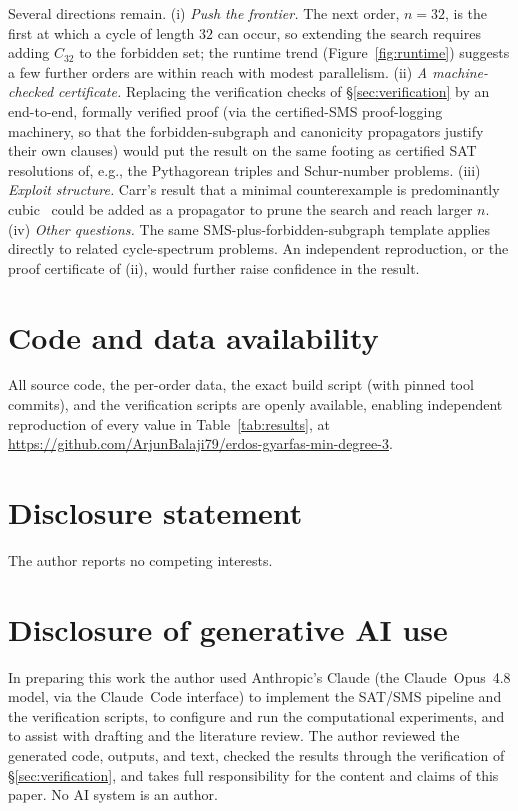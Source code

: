 \documentclass[11pt]{article}
\begin{document}
Several directions remain. (i) \emph{Push the frontier.} The next order, $n=32$,
is the first at which a cycle of length $32$ can occur, so extending the search
requires adding $C_{32}$ to the forbidden set; the runtime trend
(Figure~\ref{fig:runtime}) suggests a few further orders are within reach with
modest parallelism. (ii) \emph{A machine-checked certificate.} Replacing the verification
checks of \S\ref{sec:verification} by an end-to-end, formally verified proof (via
the certified-SMS proof-logging machinery, so that the forbidden-subgraph and
canonicity propagators justify their own clauses) would put the result on the
same footing as certified SAT resolutions of, e.g., the Pythagorean triples and
Schur-number problems. (iii) \emph{Exploit structure.} Carr's result that a minimal
counterexample is predominantly cubic~\cite{carr2026} could be added as a
propagator to prune the search and reach larger $n$. (iv) \emph{Other questions.}
The same SMS-plus-forbidden-subgraph template applies directly to related
cycle-spectrum problems. An independent reproduction, or the proof certificate of
(ii), would further raise confidence in the result.

\section*{Code and data availability}
All source code, the per-order data, the exact build script (with pinned tool
commits), and the verification scripts are openly available, enabling independent
reproduction of every value in Table~\ref{tab:results}, at
\url{https://github.com/ArjunBalaji79/erdos-gyarfas-min-degree-3}.

\section*{Disclosure statement}
The author reports no competing interests.

\section*{Disclosure of generative AI use}
In preparing this work the author used Anthropic's Claude (the Claude~Opus~4.8
model, via the Claude~Code interface) to implement the SAT/SMS pipeline and the
verification scripts, to configure and run the computational experiments, and to
assist with drafting and the literature review. The author reviewed the generated
code, outputs, and text, checked the results through the verification of
\S\ref{sec:verification}, and takes full responsibility for the content and claims
of this paper. No AI system is an author.
\end{document}
